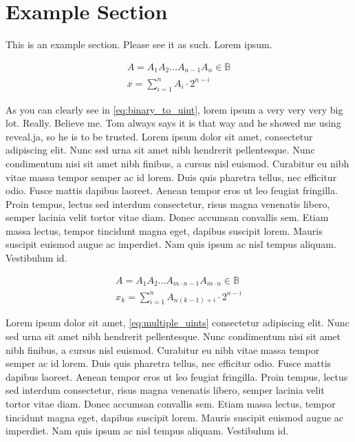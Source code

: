 \documentclass{article}
\begin{document}
\section{Example Section}
This is an example section. Please see it as such. Lorem ipsum. 

\begin{gather}
A = A_1 A_2 \dots A_{n-1} A_n \in \mathbb{B} \nonumber \\
\label{eq:binary_to_uint}
x = \sum\limits_{i=1}^n A_i \cdot 2^{n-i}
\end{gather}

As you can clearly see in \ref{eq:binary_to_uint}, lorem ipsum a very very very big lot. Really. Believe me. Tom always says it is that way and he showed me using reveal.ja, so he is to be trusted. Lorem ipsum dolor sit amet, consectetur adipiscing elit. Nunc sed urna sit amet nibh hendrerit pellentesque. Nunc condimentum nisi sit amet nibh finibus, a cursus nisl euismod. Curabitur eu nibh vitae massa tempor semper ac id lorem. Duis quis pharetra tellus, nec efficitur odio. Fusce mattis dapibus laoreet. Aenean tempor eros ut leo feugiat fringilla. Proin tempus, lectus sed interdum consectetur, risus magna venenatis libero, semper lacinia velit tortor vitae diam. Donec accumsan convallis sem. Etiam massa lectus, tempor tincidunt magna eget, dapibus suscipit lorem. Mauris suscipit euismod augue ac imperdiet. Nam quis ipsum ac nisl tempus aliquam. Vestibulum id.

\begin{gather}
A = A_1 A_2 \dots A_{m \cdot n-1} A_{m \cdot n} \in \mathbb{B} \nonumber \\
\label{eq:multiple_uints}
x_k = \sum\limits_{i=1}^n A_{n(k-1)+i} \cdot 2^{n-i}
\end{gather}

Lorem ipsum dolor sit amet, \ref{eq:multiple_uints} consectetur adipiscing elit. Nunc sed urna sit amet nibh hendrerit pellentesque. Nunc condimentum nisi sit amet nibh finibus, a cursus nisl euismod. Curabitur eu nibh vitae massa tempor semper ac id lorem. Duis quis pharetra tellus, nec efficitur odio. Fusce mattis dapibus laoreet. Aenean tempor eros ut leo feugiat fringilla. Proin tempus, lectus sed interdum consectetur, risus magna venenatis libero, semper lacinia velit tortor vitae diam. Donec accumsan convallis sem. Etiam massa lectus, tempor tincidunt magna eget, dapibus suscipit lorem. Mauris suscipit euismod augue ac imperdiet. Nam quis ipsum ac nisl tempus aliquam. Vestibulum id.
\end{document}
